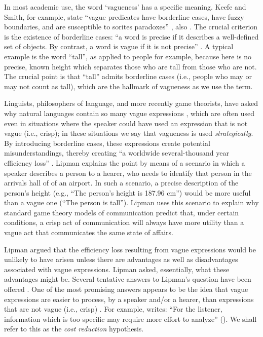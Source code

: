 In most academic use, the word `vagueness' has a specific meaning. Keefe and Smith, for example, state ``vague predicates have borderline cases, have fuzzy boundaries, and are susceptible to sorites paradoxes'' \citep[p.~4]{keefe1997vagueness}, also \citet{EgreKlinedinst}.  The crucial criterion is the existence of borderline cases: ``a word is precise if it describes a well-defined set of objects. By contrast, a word is vague if it is not precise'' \citet[p.~1]{lipmanvague}. A typical example is the word ``tall'', as applied to people for example, because here is no precise, known height which separates those who are tall from those who are not. The crucial point is that ``tall'' admits borderline cases (i.e., people who may or may not count as tall), which are the hallmark of vagueness as we use the term.

Linguists, philosophers of language, and more recently game theorists, have asked why natural languages contain so many vague expressions \citet{Lipman:2000fk, lipmanvague}, which are
often used even in situations where the speaker could have used an expression that is not vague (i.e., crisp); in these situations we say that vagueness is used \emph{strategically}. By introducing borderline cases, these expressions create potential misunderstandings, thereby creating ``a worldwide several-thousand year efficiency loss'' \citet[][p.~1]{lipmanvague}. Lipman explains the point by means of a scenario in which a speaker describes a person to a hearer, who needs to identify that person in the arrivals hall of of an airport. In such a scenario, a precise description of the person's height (e.g., ``The person's height is 187.96 cm'') would be more useful than a vague one (``The person is tall''). Lipman uses this scenario to explain why standard game theory models of communication \citep[e.g.,][]{Crawford:1982lr} predict that, under certain conditions, a crisp act of communication will always have more utility than a vague act that communicates the same state of affairs. 

Lipman argued that the efficiency loss resulting from vague expressions would be unlikely to have arisen unless there are advantages as well as disadvantages associated with vague expressions. Lipman asked, essentially, what these advantages might be. Several tentative answers to Lipman's question have been offered \citep[see][]{van2009utility, vanDeemterBook}. One of the most promising answers appears to be the idea that vague expressions are easier to process, by a speaker and/or a hearer, than expressions that are not vague (i.e., crisp) \citep[e.g.,][]{lipmanvague,De-Jaegher:2003lr,vanrooij2003lr}. For example, \citeauthor{lipmanvague} writes: ``For the listener, information which is too specific may require more effort to analyze'' (\citeyear[][p.~11]{lipmanvague}). We shall refer to this as the \emph{cost reduction} hypothesis. 

